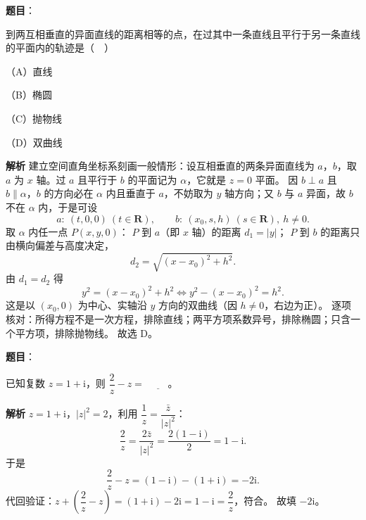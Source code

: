 \begin{answer}

\textbf{题目}：

到两互相垂直的异面直线的距离相等的点，在过其中一条直线且平行于另一条直线的平面内的轨迹是（　）

（A）直线

（B）椭圆

（C）抛物线

（D）双曲线

\textbf{解析}
建立空间直角坐标系刻画一般情形：设互相垂直的两条异面直线为 $a$，$b$，取 $a$ 为 $x$ 轴。过 $a$ 且平行于 $b$ 的平面记为 $\alpha$，它就是 $z=0$ 平面。
因 $b\perp a$ 且 $b\parallel\alpha$，$b$ 的方向必在 $\alpha$ 内且垂直于 $a$，不妨取为 $y$ 轴方向；又 $b$ 与 $a$ 异面，故 $b$ 不在 $\alpha$ 内，于是可设
\nopagebreak[4]
\[a:\ (t,0,0)\ (t\in\mathbf R),\qquad b:\ (x_0,s,h)\ (s\in\mathbf R),\ h\neq0.\]
取 $\alpha$ 内任一点 $P(x,y,0)$：
$P$ 到 $a$（即 $x$ 轴）的距离 $d_1=\left|y\right|$；
$P$ 到 $b$ 的距离只由横向偏差与高度决定，
\nopagebreak[4]
\[d_2=\sqrt{\left(x-x_0\right)^2+h^2}.\]
由 $d_1=d_2$ 得
\nopagebreak[4]
\[y^2=\left(x-x_0\right)^2+h^2\iff y^2-\left(x-x_0\right)^2=h^2.\]
这是以 $\left(x_0,0\right)$ 为中心、实轴沿 $y$ 方向的双曲线（因 $h\neq0$，右边为正）。
逐项核对：所得方程不是一次方程，排除直线；两平方项系数异号，排除椭圆；只含一个平方项，排除抛物线。
故选 D。


\end{answer}
\begin{answer}

\textbf{题目}：

已知复数 $z=1+\mathrm{i}$，则 $\dfrac2z-z=$ $\underline{\qquad}$。

\textbf{解析}
$z=1+\mathrm{i}$，$\left|z\right|^2=2$，利用 $\dfrac1z=\dfrac{\bar z}{\left|z\right|^2}$：
\nopagebreak[4]
\[\frac2z=\frac{2\bar z}{\left|z\right|^2}=\frac{2\left(1-\mathrm{i}\right)}{2}=1-\mathrm{i}.\]
于是
\nopagebreak[4]
\[\frac2z-z=\left(1-\mathrm{i}\right)-\left(1+\mathrm{i}\right)=-2\mathrm{i}.\]
代回验证：$z+\left(\dfrac2z-z\right)=\left(1+\mathrm{i}\right)-2\mathrm{i}=1-\mathrm{i}=\dfrac2z$，符合。
故填 $-2\mathrm{i}$。


\end{answer}
